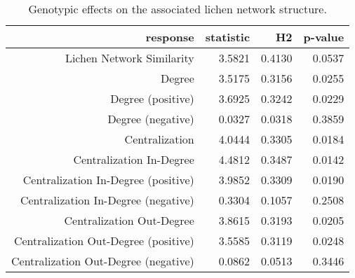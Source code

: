 \begin{table}[ht]
\centering
\begin{tabular}{rrrr}
  \hline
response & statistic & H2 & p-value \\ 
  \hline
Lichen Network Similarity & 3.5821 & 0.4130 & 0.0537 \\ 
  Degree & 3.5175 & 0.3156 & 0.0255 \\ 
  Degree (positive) & 3.6925 & 0.3242 & 0.0229 \\ 
  Degree (negative) & 0.0327 & 0.0318 & 0.3859 \\ 
  Centralization & 4.0444 & 0.3305 & 0.0184 \\ 
  Centralization In-Degree & 4.4812 & 0.3487 & 0.0142 \\ 
  Centralization In-Degree (positive) & 3.9852 & 0.3309 & 0.0190 \\ 
  Centralization In-Degree (negative) & 0.3304 & 0.1057 & 0.2508 \\ 
  Centralization Out-Degree & 3.8615 & 0.3193 & 0.0205 \\ 
  Centralization Out-Degree (positive) & 3.5585 & 0.3119 & 0.0248 \\ 
  Centralization Out-Degree (negative) & 0.0862 & 0.0513 & 0.3446 \\ 
   \hline
\end{tabular}
\caption{Genotypic effects on the associated lichen network structure.} 
\label{tab:h2_net}
\end{table}
